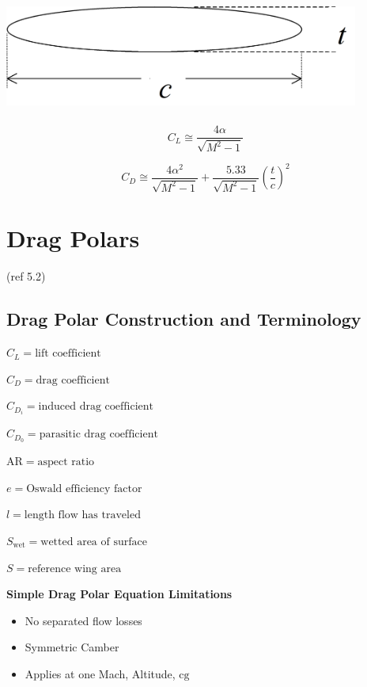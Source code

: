 \documentclass[
]{book}
\providecommand{\tightlist}{%
  \setlength{\itemsep}{0pt}\setlength{\parskip}{0pt}}
\begin{document}
\includegraphics[width=4.596in,height=1.444in]{media/05/image72.svg}

\[C_L \cong \frac{4 \alpha}{\sqrt{M^2 - 1} }\]

\[C_D \cong \frac{4 \alpha^2}{\sqrt{M^2 - 1}} + \frac{5.33}{\sqrt{M^2 - 1}}\left(\frac{t}{c}\right)^2\]

\hypertarget{drag-polars}{%
\section{Drag Polars}\label{drag-polars}}

(ref 5.2)

\hypertarget{drag-polar-construction-and-terminology}{%
\subsection{Drag Polar Construction and Terminology}\label{drag-polar-construction-and-terminology}}

\(C_L = \text{lift coefficient}\)

\(C_D = \text{drag coefficient}\)

\(C_{D_i} = \text{induced drag coefficient}\)

\(C_{D_0} = \text{parasitic drag coefficient}\)

\(\mathrm{AR} = \text{aspect ratio}\)

\(e = \text{Oswald efficiency factor}\)

\(l = \text{length flow has traveled}\)

\(S_{\mathrm{wet}} = \text{wetted area of surface}\)

\(S = \text{reference wing area}\)

\textbf{Simple Drag Polar Equation Limitations}

\begin{itemize}
\tightlist
\item
  No separated flow losses
\item
  Symmetric Camber
\item
  Applies at one Mach, Altitude, \(\mathrm{cg}\)
\end{itemize}
\end{document}
